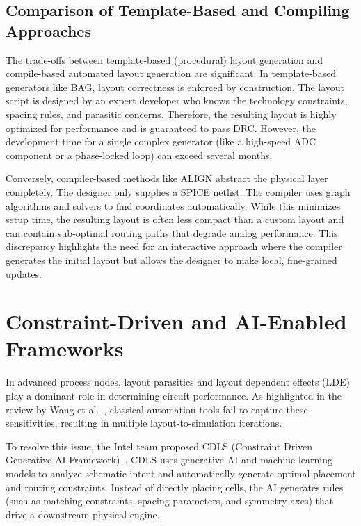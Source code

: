 \subsection{Comparison of Template-Based and Compiling Approaches}

The trade-offs between template-based (procedural) layout generation and compile-based automated layout generation are significant. In template-based generators like BAG, layout correctness is enforced by construction. The layout script is designed by an expert developer who knows the technology constraints, spacing rules, and parasitic concerns. Therefore, the resulting layout is highly optimized for performance and is guaranteed to pass DRC. However, the development time for a single complex generator (like a high-speed ADC component or a phase-locked loop) can exceed several months. 

Conversely, compiler-based methods like ALIGN abstract the physical layer completely. The designer only supplies a SPICE netlist. The compiler uses graph algorithms and solvers to find coordinates automatically. While this minimizes setup time, the resulting layout is often less compact than a custom layout and can contain sub-optimal routing paths that degrade analog performance. This discrepancy highlights the need for an interactive approach where the compiler generates the initial layout but allows the designer to make local, fine-grained updates.

\section{Constraint-Driven and AI-Enabled Frameworks}
\label{sec:lit_constraints}

In advanced process nodes, layout parasitics and layout dependent effects (LDE) play a dominant role in determining circuit performance. As highlighted in the review by Wang et al.~\cite{rfit_review}, classical automation tools fail to capture these sensitivities, resulting in multiple layout-to-simulation iterations.

To resolve this issue, the Intel team proposed CDLS (Constraint Driven Generative AI Framework)~\cite{cdls}. CDLS uses generative AI and machine learning models to analyze schematic intent and automatically generate optimal placement and routing constraints. Instead of directly placing cells, the AI generates rules (such as matching constraints, spacing parameters, and symmetry axes) that drive a downstream physical engine.

